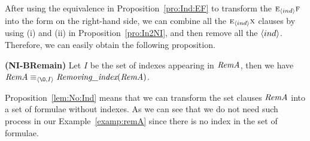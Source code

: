 \documentclass[letterpaper]{article} %
\begin{document}




After using the equivalence in Proposition~\ref{pro:Ind:EF} to transform the $\textsc{e}_{{\langle{ind}\rangle}} \textsc{f}$ into the form on the right-hand side, we can combine all the $\textsc{e}_{{\langle{ind}\rangle}} \textsc{x}$ clauses by using (i) and (ii) in Proposition~\ref{pro:In2NI}, 
and then remove all the ${\langle{ind}\rangle}$.
Therefore, we can easily obtain the following proposition.

\begin{proposition}\label{lem:No:Ind}
\textbf{(NI-BRemain)}
Let $I$ be the set of indexes appearing in $\emph{RemA}$, then
we have $\emph{RemA}\equiv_{\tuple{{\O}, I}} \emph{Removing\_index}(\emph{RemA})$.
\end{proposition}
Proposition~\ref{lem:No:Ind} means that we can transform the set clauses $\emph{RemA}$ into a set of formulae without indexes.
As we can see that we do not need such  process in our Example~\ref{examp:remA} since there is no index in the set of formulae.
\end{document}
